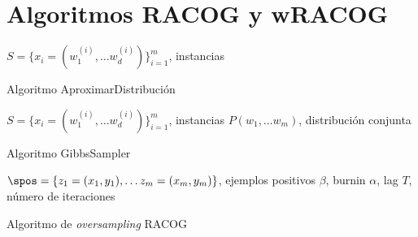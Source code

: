 \section{Algoritmos RACOG y wRACOG}

\begin{algorithm}[H]
\begin{algorithmic}[1]
  \REQUIRE $S = \{x_i=(w_1^{(i)}, \ldots w_d^{(i)})\}_{i=1}^m$, instancias
  \ENDFOR
\end{algorithmic}
\caption{Algoritmo AproximarDistribución}
\label{alg:aproxdist}
\end{algorithm}

\begin{algorithm}[H]
\begin{algorithmic}[1]
  \REQUIRE $S = \{x_i=(w_1^{(i)}, \ldots w_d^{(i)})\}_{i=1}^m$, instancias
  \REQUIRE $P(w_1, \ldots w_m)$, distribución conjunta
    \ENDFOR
  \ENDFOR
\end{algorithmic}
\caption{Algoritmo GibbsSampler}
\label{alg:gibbs}
\end{algorithm}


\begin{algorithm}[H]
\begin{algorithmic}[1]
  \REQUIRE $\spos = \{z_1=(x_1, y_1), \ldots z_m=(x_m, y_m)\}$, ejemplos positivos
  \REQUIRE $\beta$, burnin
  \REQUIRE $\alpha$, lag
  \REQUIRE $T$, número de iteraciones
  \NEWLINE
    \NEWLINE
    \ENDIF
  \ENDFOR
  \NEWLINE
\end{algorithmic}
\caption{Algoritmo de \textit{oversampling} RACOG}
\label{alg:racog}
\end{algorithm}


